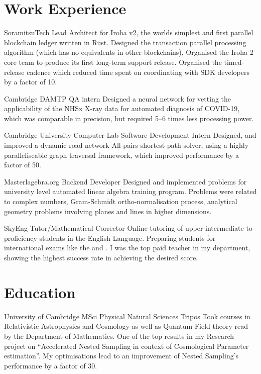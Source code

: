 \documentclass{CurriculumVitae}[10pt, draft, condensed]
\begin{document}
\section*{Work Experience} {\setlength{\parindent}{0in}

   {Soramitsu}{Tech Lead} { Architect for Iroha v2, the
    worlds simplest and first parallel blockchain ledger written in
    Rust.  Designed the transaction parallel processing algorithm
    (which has no equivalents in other blockchains), Organised the
    Iroha 2 core team to produce its first long-term support release.
    Organised the timed-release cadence which reduced time spent on
    coordinating with SDK developers by a factor of 10.}

   {Cambridge DAMTP} {QA intern} {Designed a neural
    network for vetting the applicability of the NHSx X-ray data for
    automated diagnosis of COVID-19, which was comparable in
    precision, but required 5--6 times less processing power. }

   {Cambridge University Computer Lab}
  {Software Development Intern} {Designed, and improved a dynamic road
    network All-pairs shortest path solver, using a highly
    paralleliseable graph traversal framework, which improved
    performance by a factor of 50. }

  {Masterlagebra.org} {Backend Developer} {Designed and implemented
    problems for university level automated linear algebra training
    program. Problems were related to complex numbers, Gram-Schmidt
    ortho-normalisation process, analytical geometry problems
    involving planes and lines in higher dimensions. }

   {SkyEng} {Tutor/Mathematical Corrector} {Online
    tutoring of upper-intermediate to proficiency students in the
    English Language. Preparing students for international exams like
    the   and . I was
    the top paid teacher in my department, showing the highest success
    rate in achieving the desired 
    score. }

  \section*{Education}

   {University
    of Cambridge} {MSci } { Physical Natural Sciences Tripos}
  {Took courses in Relativistic Astrophysics and Cosmology as well as
    Quantum Field theory read by the Department of Mathematics. One of
    the top results in my Research project on ``Accelerated Nested
    Sampling in context of Cosmological Parameter estimation''. My
    optimisations lead to an improvement of Nested Sampling's
    performance by a factor of 30. }

}
\end{document}
